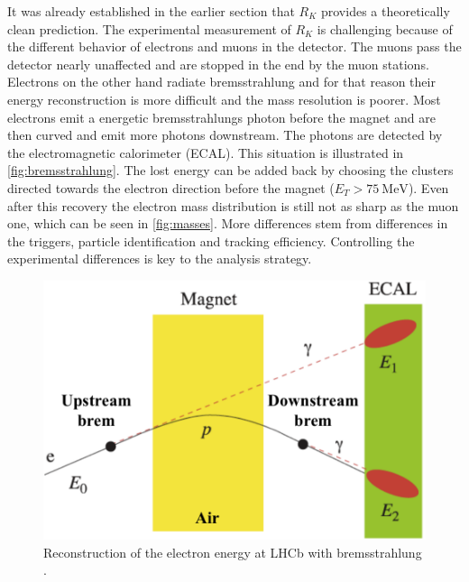 It was already established in the earlier section that $R_K$ provides
a theoretically clean prediction.
The experimental measurement of $R_K$ is challenging because
of the different behavior of electrons and muons in the detector.
The muons pass the detector nearly unaffected and are stopped in the end
by the muon stations.
Electrons on the other hand radiate bremsstrahlung and for that
reason their energy reconstruction is more difficult
and the mass resolution is poorer.
Most electrons emit a energetic bremsstrahlungs photon before the magnet and
are then curved and emit more photons downstream. The photons are detected by the
electromagnetic calorimeter (ECAL).
This situation is illustrated
in \autoref{fig:bremsstrahlung}.
The lost energy can be added back by choosing
the clusters directed towards the electron direction before the magnet ($E_{T}>\SI{75}{\mega\electronvolt}$).
Even after this recovery the electron mass distribution is still not as sharp as the muon one, which can
be seen in \autoref{fig:masses}.
More differences stem from differences in the triggers, particle identification and tracking efficiency.
Controlling the experimental differences is key to the analysis strategy.
\begin{figure}
	\centering
	\includegraphics[width=0.8\linewidth]{media/electronbrems.png}
	\caption{Reconstruction of the electron energy at LHCb with bremsstrahlung \cite{petridis2021test}.}%
	\label{fig:bremsstrahlung}
\end{figure}

